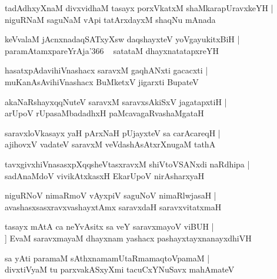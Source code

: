 \documentclass[twoside,12pt,openright]{book}
\newcounter{shloka}[chapter]
\begin{document}
\begin{shloka}%
tadAdhxyXnaM divxvidhaM tasayx porxVkatxM shaMkarapUravxkeYH |\\
niguRNaM saguNaM vApi tatArxdayxM shaqNu mAnada  
\end{shloka}

\begin{shloka}%
keVvalaM jAcnxnadaqSATxyXsw daqshayxteV yoVgayukitxBiH |\\
paramAtamxpareYrAja\char'366 ~ satataM dhayxnatatapxreYH 
\end{shloka}

\begin{shloka}%
hasatxpAdavihiVnashacx saravxM gaqhANxti gacacxti |\\
muKanAsAvihiVnashacx BuMketxV jigarxti BupateV
\end{shloka}

\begin{shloka}%
akaNaRshayxqqNuteV saravxM saravxsAkiSxV jagatapxtiH |\\
arUpoV rUpasaMbadadhxH paMcavagaRvashaMgataH 
\end{shloka}

\begin{shloka}%
saravxloVkasayx yaH pArxNaH pUjayxteV sa carAcareqH |\\
ajihovxV vadateV saravxM veVdashAsAtxrXnugaM tathA 
\end{shloka}

\begin{shloka}%
tavxgivxhiVnasasxpXqqsheVtasxravxM shiVtoVSANxdi naRdhipa |\\
sadAnaMdoV vivikAtxkasxH EkarUpoV nirAsharxyaH 
\end{shloka}

\begin{shloka}%
niguRNoV nimaRmoV vAyxpiV saguNoV nimaRlwjasaH |\\
avashasxsasxravxvashayxtAmx saravxdaH saravxvitatxmaH 
\end{shloka}

\begin{shloka}%
tasayx mAtA ca neYvAsitx sa veY saravxmayoV viBUH |\\]
EvaM saravxmayaM dhayxnam yashacx pashayxtayxnanayxdhiVH 
\end{shloka}

\begin{shloka}%
sa yAti paramaM sAthxnamamUtaRmamaqtoVpamaM |\\
divxtiVyaM tu parxvakASxyXmi tacuCxYNuSavx mahAmateV 
\end{shloka}
\end{document}
